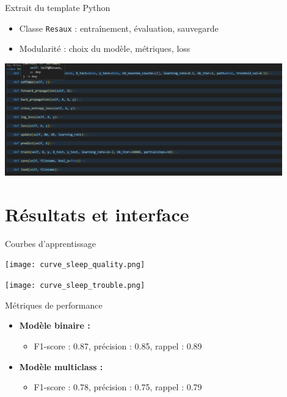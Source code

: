 \documentclass{beamer}
\begin{document}
\begin{frame}{Extrait du template Python}
  \begin{itemize}
    \item Classe \texttt{Resaux} : entraînement, évaluation, sauvegarde
    \item Modularité : choix du modèle, métriques, loss
  \end{itemize}
  \begin{center}
    \includegraphics[width=0.9\textwidth]{screen_class.png}
  \end{center}
\end{frame}

\section{Résultats et interface}

\begin{frame}{Courbes d'apprentissage}
    \begin{center}

      \begin{minipage}{0.7\linewidth}
        \centering
        \texttt{[image: curve\_sleep\_quality.png]}
      \end{minipage}

      \begin{minipage}{0.7\linewidth}
        \centering
        \texttt{[image: curve\_sleep\_trouble.png]}
      \end{minipage}
    \end{center}
\end{frame}

\begin{frame}{Métriques de performance}
  \begin{itemize}
    \item \textbf{Modèle binaire :}
    \begin{itemize}
      \item F1-score : 0.87, précision : 0.85, rappel : 0.89
    \end{itemize}
    \item \textbf{Modèle multiclass :}
    \begin{itemize}
      \item F1-score : 0.78, précision : 0.75, rappel : 0.79
    \end{itemize}
  \end{itemize}
\end{frame}
\end{document}

